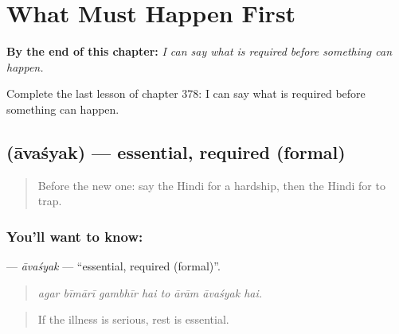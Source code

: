 
\chapter{What Must Happen First}
\label{ch:hi-what-must-happen-first}

\begin{chapteropening}
\textbf{By the end of this chapter:} \emph{I can say what is required before something can happen.}

Complete the last lesson of chapter 378: I can say what is required before something can happen.
\end{chapteropening}

\section[\texorpdfstring{\hi{आवश्यक} (āvaśyak)}{आवश्यक (āvaśyak)}]{ (āvaśyak) — essential, required (formal)}

\label{lesson:HI-C378-avasyak}



\begin{quote}
Before the new one: say the Hindi for a hardship, then the Hindi for to trap.
\end{quote}

\subsection*{You'll want to know: }
\textbf{} — \emph{āvaśyak} — \textquotedblleft{}essential, required (formal)\textquotedblright{}.

\begin{quote}
       
\end{quote}

\begin{quote}
\emph{agar bīmārī gambhīr hai to ārām āvaśyak hai.}
\end{quote}

\begin{quote}
If the illness is serious, rest is essential.
\end{quote}

